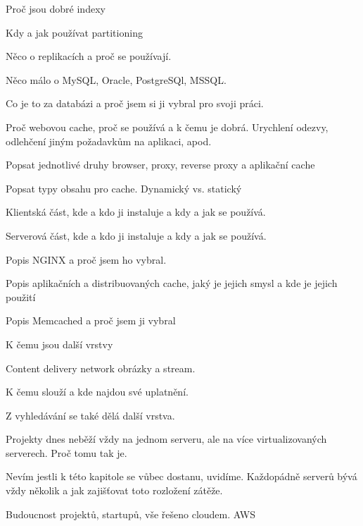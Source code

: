 \documentclass[12pt]{article}
\begin{document}
Proč jsou dobré indexy

Kdy a jak používat partitioning

Něco o replikacích a proč se používají.

Něco málo o MySQL, Oracle, PostgreSQl, MSSQL.

Co je to za databázi a proč jsem si ji vybral pro svoji práci.



Proč webovou cache, proč se používá a k čemu je dobrá. Urychlení odezvy, odlehčení jiným požadavkům na aplikaci, apod.

Popsat jednotlivé druhy browser, proxy, reverse proxy a aplikační cache

Popsat typy obsahu pro cache. Dynamický vs. statický

Klientská část, kde a kdo ji instaluje a kdy a jak se používá.

Serverová část, kde a kdo ji instaluje a kdy a jak se používá.

Popis NGINX a proč jsem ho vybral.

Popis aplikačních a distribuovaných cache, jaký je jejich smysl a kde je jejich použití

Popis Memcached a proč jsem ji vybral


K čemu jsou další vrstvy

Content delivery network obrázky a stream.

K čemu slouží a kde najdou své uplatnění.

Z vyhledávání se také dělá další vrstva.



Projekty dnes neběží vždy na jednom serveru, ale na více virtualizovaných serverech. Proč tomu tak je.


Nevím jestli k této kapitole se vůbec dostanu, uvidíme. Každopádně serverů bývá vždy několik a jak zajišťovat toto rozložení zátěže.


Budoucnost projektů, startupů, vše řešeno cloudem. AWS
\end{document}

